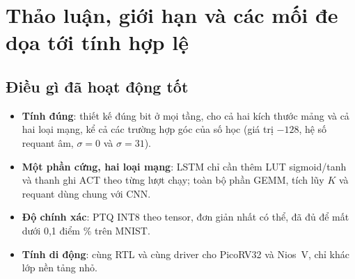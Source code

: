 \chapter{Thảo luận, giới hạn và các mối đe dọa tới tính hợp lệ}
\label{ch:discussion}

\section{Điều gì đã hoạt động tốt}
\begin{itemize}
  \item \textbf{Tính đúng}: thiết kế đúng bit ở mọi tầng, cho cả hai kích thước mảng và cả hai loại mạng, kể cả các trường hợp góc của số học (giá trị $-128$, hệ số requant âm, $\sigma=0$ và $\sigma=31$).
  \item \textbf{Một phần cứng, hai loại mạng}: LSTM chỉ cần thêm LUT sigmoid/tanh và thanh ghi ACT theo từng lượt chạy; toàn bộ phần GEMM, tích lũy $K$ và requant dùng chung với CNN.
  \item \textbf{Độ chính xác}: PTQ INT8 theo tensor, đơn giản nhất có thể, đã đủ để mất dưới 0,1 điểm \% trên MNIST.
  \item \textbf{Tính di động}: cùng RTL và cùng driver cho PicoRV32 và Nios~V, chỉ khác lớp nền tảng nhỏ.
\end{itemize}

